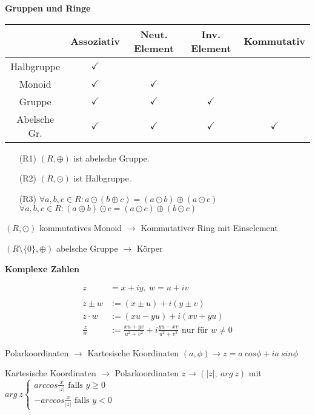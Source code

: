 \documentclass[10pt,fleqn, a4paper]{article}
\begin{document}
{\bf Gruppen und Ringe}\newline

\begin{center}

\begin{tabular}{|c|c|c|c|c|}\hline
&Assoziativ& Neut. Element&Inv. Element&Kommutativ\\\hline\hline
Halbgruppe&$\checkmark$&&&\\\hline
Monoid&$\checkmark$&$\checkmark$&&\\\hline
Gruppe&$\checkmark$&$\checkmark$&$\checkmark$&\\\hline
Abelsche Gr.&$\checkmark$&$\checkmark$&$\checkmark$&$\checkmark$\\\hline
\end{tabular}


\vspace{0.5cm}

\begin{itemize}
\item[(R1)] $(R,\oplus)$ ist abelsche Gruppe.
\item[(R2)] $(R,\odot)$ ist Halbgruppe.
\item[(R3)] $\forall a,b,c\in R:a\odot(b\oplus c)=(a\odot b)\oplus (a\odot c)$\\
$\forall a,b,c\in R:(a\oplus b)\odot c=(a\odot c)\oplus (b\odot c)$
\end{itemize}

$(R,\odot)$ kommutatives Monoid $\rightarrow$ Kommutativer Ring mit Einselement

$(R\setminus\{0\},\oplus)$ abelsche Gruppe $\rightarrow$ Körper

\end{center}

\vspace{1cm}

{\bf Komplexe Zahlen}

\begin{align*}
z&=x+iy,\ w=u+iv\\\\
z\pm w&:= (x\pm u)+i(y\pm v)\\
z\cdot w&:=(xu-yu)+i(xv+yu)\\
\frac{z}{w}&:=\frac{xu+yv}{u^2+v^2}+i\frac{yu-xv}{u^2+v^2}\text{ nur für }w\neq 0
\end{align*}

Polarkoordinaten $\rightarrow$ Kartesische Koordinaten $(a,\phi)\rightarrow z=a\ cos\phi+i a\ sin\phi$

Kartesische Koordinaten $\rightarrow$ Polarkoordinaten $z \rightarrow (|z|,\ arg\ z)$ mit $arg\ z\left\{\begin{matrix}
arccos\frac{x}{|z|}\text{ falls }y\geq0\\
-arccos\frac{x}{|z|}\text{ falls }y<0
\end{matrix}\right.$
\end{document}
